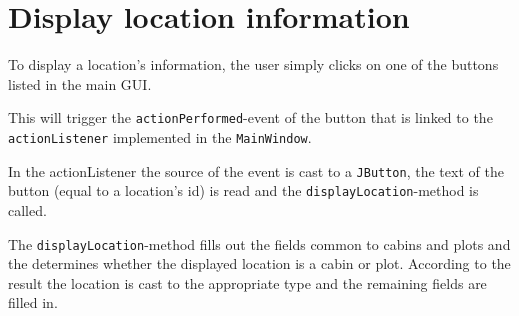 \section{Display location information}
\label{sec:location_information}

To display a location's information, the user simply clicks on one of the buttons listed in the main \ac{GUI}.

This will trigger the \texttt{actionPerformed}-event of the button that is linked to the \texttt{actionListener} implemented in the \texttt{MainWindow}.

In the actionListener the source of the event is cast to a \texttt{JButton}, the text of the button (equal to a location's id) is read and the \texttt{displayLocation}-method is called.

The \texttt{displayLocation}-method fills out the fields common to cabins and plots and the determines whether the displayed location is a cabin or plot. According to the result the location is cast to the appropriate type and the remaining fields are filled in.